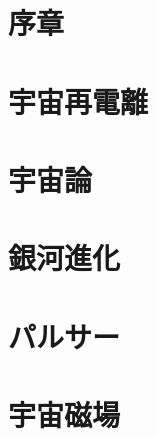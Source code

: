 \documentclass[a4j,twoside,11pt]{jreport}
\begin{document}


\tableofcontents


\chapter{序章}\label{introduction}







\chapter{宇宙再電離}\label{EoR}








\chapter{宇宙論}\label{cosmology}








\chapter{銀河進化}\label{galaxy}









\chapter{パルサー}\label{pulsar}








\chapter{宇宙磁場}\label{magnetism}






\end{document}
